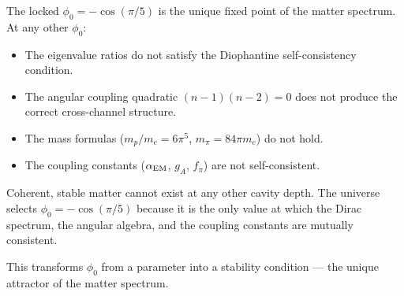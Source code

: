 \documentclass[11pt,letterpaper]{article}
\numberwithin{equation}{section}
\begin{document}
The locked $\phi_0 = -\cos(\pi/5)$ is the unique fixed point of the
matter spectrum.  At any other $\phi_0$:
\begin{itemize}
\item The eigenvalue ratios do not satisfy the Diophantine
  self-consistency condition.
\item The angular coupling quadratic $(n-1)(n-2) = 0$ does not
  produce the correct cross-channel structure.
\item The mass formulas ($m_p/m_e = 6\pi^5$, $m_\pi = 84\pi m_e$)
  do not hold.
\item The coupling constants ($\alpha_{\rm EM}$, $g_A$, $f_\pi$) are
  not self-consistent.
\end{itemize}
Coherent, stable matter cannot exist at any other cavity depth.  The
universe selects $\phi_0 = -\cos(\pi/5)$ because it is the only value
at which the Dirac spectrum, the angular algebra, and the coupling
constants are mutually consistent.

This transforms $\phi_0$ from a parameter into a stability condition
--- the unique attractor of the matter spectrum.
\end{document}
